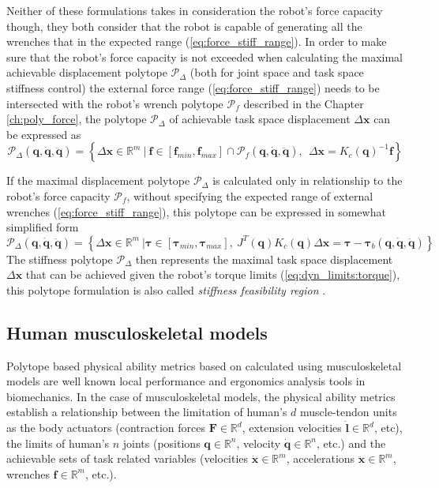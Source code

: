 Neither of these formulations takes in consideration the robot's force capacity though, they both consider that the robot is capable of generating all the wrenches that in the expected range (\ref{eq:force_stiff_range}). 
In order to make sure that the robot's force capacity is not exceeded when calculating the maximal achievable displacement polytope $\mathcal{P}_\Delta$ (both for joint space and task space stiffness control) the external force range (\ref{eq:force_stiff_range}) needs to be intersected with the robot's  wrench polytope  $\mathcal{P}_f$ described in the Chapter \ref{ch:poly_force}, the polytope $\mathcal{P}_\Delta$ of achievable task space displacement $\Delta \bm{x}$ can be expressed as
\begin{equation}
    \mathcal{P}_\Delta(\bm{q},\dot{\bm{q}},\ddot{\bm{q}}) = \left\{ \Delta\bm{x} \in \mathbb{R}^m ~|~ \bm{f}\in \left[\bm{f}_{min}, \bm{f}_{max} \right] \cap \mathcal{P}_f(\bm{q},\dot{\bm{q}},\ddot{\bm{q}}),  ~~  \Delta\bm{x}=K_c(\bm{q})^{-1}\bm{f}\right\}
\end{equation}

If the maximal displacement polytope $\mathcal{P}_\Delta$ is calculated only in relationship to the robot's force capacity $\mathcal{P}_f$, without specifying the expected range of external wrenches (\ref{eq:force_stiff_range}), this polytope can be expressed in somewhat simplified form
\begin{equation}
    \mathcal{P}_\Delta(\bm{q},\dot{\bm{q}},\ddot{\bm{q}}) =\! \left\{ \Delta\bm{x} \in \mathbb{R}^m ~|\bm{\tau}\in\left[\bm{\tau}_{min}, \bm{\tau}_{max} \right]\!,\! ~ J^T(\bm{q})K_c(\bm{q})\Delta\bm{x}\!= \bm{\tau}\! -\! \bm{\tau}_b(\bm{q},\dot{\bm{q}},\ddot{\bm{q}}) \right\}
\end{equation}
The stiffness polytope $\mathcal{P}_\Delta$ then represents the maximal task space displacement $\Delta \bm{x}$ that can be achieved given the robot's torque limits (\ref{eq:dyn_limits:torque}), this polytope formulation is also called \textit{stiffness feasibility region} \cite{ajoudani2017choosing,ajoudani2015role}.

\subsection{Human musculoskeletal models}
\label{ch:human_metrics}
Polytope based physical ability metrics based on calculated using musculoskeletal models are well known local performance and ergonomics analysis tools in biomechanics. In the case of musculoskeletal models, the physical ability metrics establish a relationship between the limitation of human's $d$ muscle-tendon units as the body actuators (contraction forces $\bm{F} \in \mathbb{R}^d$, extension velocities $\dot{\bm{l}} \in \mathbb{R}^d$, etc), the limits of human's $n$ joints (positions $\bm{q}\in \mathbb{R}^n$, velocity $\dot{\bm{q}}\in \mathbb{R}^n$, etc.) and the achievable sets of task related variables (velocities $\dot{\bm{x}} \in \mathbb{R}^m$, accelerations $\ddot{\bm{x}} \in \mathbb{R}^m$, wrenches $\bm{f}\in \mathbb{R}^m$, etc.).

